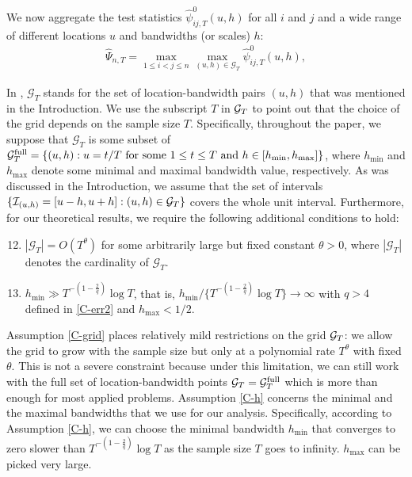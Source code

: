 \documentclass[a4paper,12pt]{article}
\makeatletter
\renewcommand{\eqref}[1]{\tagform@{\ref{#1}}}
\makeatother
\begin{document}
We now aggregate the test statistics $\hat{\psi}^0_{ij, T}(u,h)$ for all $i$ and $j$ and a wide range of different locations $u$ and bandwidths (or scales) $h$:
\begin{align}\label{eq:test:psi_hat}
	\widehat{\Psi}_{n,T} = \max_{1 \le i < j \le n}\max_{(u,h) \in \mathcal{G}_T} \hat{\psi}^0_{ij,T}(u, h),
\end{align}

In \eqref{eq:test:psi_hat}, $\mathcal{G}_T$ stands for the set of location-bandwidth pairs $(u, h)$ that was mentioned in the Introduction. We use the subscript $T$ in $\mathcal{G}_T$ to point out that the choice of the grid depends on the sample size $T$. Specifically, throughout the paper, we suppose that $\mathcal{G}_T$ is some subset of $\mathcal{G}_T^{\text{full}} = \{ (u,h): u = t/T \text{ for some } 1 \le t \le T \text{ and }\linebreak h \in [h_{\min},h_{\max}] \}$, where $h_{\min}$ and $h_{\max}$ denote some minimal and maximal bandwidth value, respectively. As was discussed in the Introduction, we assume that the set of intervals $\{\mathcal{I}_{(u, h)} = [u-h, u+h]: (u, h) \in \mathcal{G}_T\}$ covers the whole unit interval. Furthermore, for our theoretical results, we require the following additional conditions to hold:
\begin{enumerate}[label=(C\arabic*),leftmargin=1.05cm]
\setcounter{enumi}{11}

\item \label{C-grid} $|\mathcal{G}_T| = O(T^\theta)$ for some arbitrarily large but fixed constant $\theta > 0$, where $|\mathcal{G}_T|$ denotes the cardinality of $\mathcal{G}_T$. 

\item \label{C-h} $h_{\min} \gg T^{-(1-\frac{2}{q})} \log T$, that is, $h_{\min} / \{ T^{-(1-\frac{2}{q})} \log T \} \rightarrow \infty$ with $q > 4$ defined in \ref{C-err2} and $h_{\max} < 1/2$.

\end{enumerate}

Assumption \ref{C-grid} places relatively mild restrictions on the grid $\mathcal{G}_T$: we allow the grid to grow with the sample size but only at a polynomial rate $T^\theta$ with fixed $\theta$. This is not a severe constraint because under this limitation, we can still work with the full set of location-bandwidth points $\mathcal{G}_T = \mathcal{G}_T^{\text{full}}$ which is more than enough for most applied problems. Assumption \ref{C-h} concerns the minimal and the maximal bandwidths that we use for our analysis. Specifically, according to Assumption \ref{C-h}, we can choose the minimal bandwidth $h_{\min}$ that converges to zero slower than $T^{-(1-\frac{2}{q})} \log T$ as the sample size $T$ goes to infinity. $h_{\max}$ can be picked very large.
\end{document}
